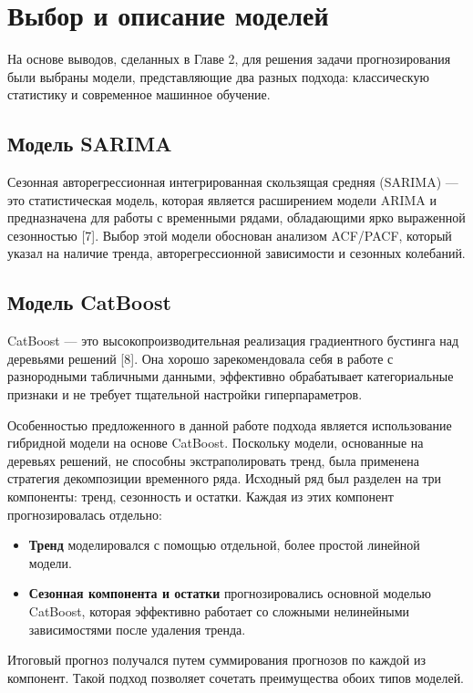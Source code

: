 \section{Выбор и описание моделей}
\label{sec:model_selection}

\hspace*{1.25cm}На основе выводов, сделанных в Главе 2, для решения задачи прогнозирования были выбраны модели, представляющие два разных подхода: классическую статистику и современное машинное обучение.

\subsection{Модель SARIMA}
\hspace*{1.25cm}Сезонная авторегрессионная интегрированная скользящая средняя (SARIMA) — это статистическая модель, которая является расширением модели ARIMA и предназначена для работы с временными рядами, обладающими ярко выраженной сезонностью [7]. Выбор этой модели обоснован анализом ACF/PACF, который указал на наличие тренда, авторегрессионной зависимости и сезонных колебаний.

\subsection{Модель CatBoost}
\hspace*{1.25cm}CatBoost — это высокопроизводительная реализация градиентного бустинга над деревьями решений [8]. Она хорошо зарекомендовала себя в работе с разнородными табличными данными, эффективно обрабатывает категориальные признаки и не требует тщательной настройки гиперпараметров.

\hspace*{1.25cm}Особенностью предложенного в данной работе подхода является использование гибридной модели на основе CatBoost. Поскольку модели, основанные на деревьях решений, не способны экстраполировать тренд, была применена стратегия декомпозиции временного ряда. Исходный ряд был разделен на три компоненты: тренд, сезонность и остатки. Каждая из этих компонент прогнозировалась отдельно:
\begin{itemize}
    \item \textbf{Тренд} моделировался с помощью отдельной, более простой линейной модели.
    \item \textbf{Сезонная компонента и остатки} прогнозировались основной моделью CatBoost, которая эффективно работает со сложными нелинейными зависимостями после удаления тренда.
\end{itemize}
Итоговый прогноз получался путем суммирования прогнозов по каждой из компонент. Такой подход позволяет сочетать преимущества обоих типов моделей.

